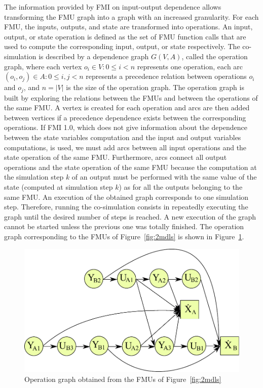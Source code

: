 The information provided by FMI on input-output dependence allows transforming the FMU graph into a graph with an increased granularity. For each FMU, the inputs, outputs, and state are transformed into operations. An input, output, or state operation is defined as the set of FMU function calls that are used to compute the corresponding input, output, or state respectively. The co-simulation is described by a dependence graph $G(V,A)$, called the operation graph, where each vertex $o_i \in V: 0 \leq i < n$ represents one operation, each arc $(o_i,o_j) \in A: 0 \leq i,j < n$ represents a precedence relation between operations $o_i$ and $o_j$, and $n = |V|$ is the size of the operation graph. The operation graph is built by exploring the relations between the FMUs and between the operations of the same FMU. A vertex is created for each operation and arcs are then added between vertices if a precedence dependence exists between the corresponding operations. If FMI 1.0, which does not give information about the dependence between the state variables computation and the input and output variables computations, is used, we must add arcs between all input operations and the state operation of the same FMU. Furthermore, arcs connect all output operations and the state operation of the same FMU because the computation at the simulation step $k$ of an output must be performed with the same value of the state (computed at simulation step $k$) as for all the outputs belonging to the same FMU. An execution of the obtained graph corresponds to one simulation step. Therefore, running the co-simulation consists in repeatedly executing the graph until the desired number of steps is reached. A new execution of the graph cannot be started unless the previous one was totally finished. The operation graph corresponding to the FMUs of Figure~\ref{fig:2mdls} is shown in Figure~\ref{fig:dag}.

\begin{figure}[htb]
\centering
  \includegraphics[scale=0.5]{figures/Operation_Graph_Two_Models}
\caption{Operation graph obtained from the FMUs of Figure~\ref{fig:2mdls}}
\label{fig:dag}
\end{figure} 

